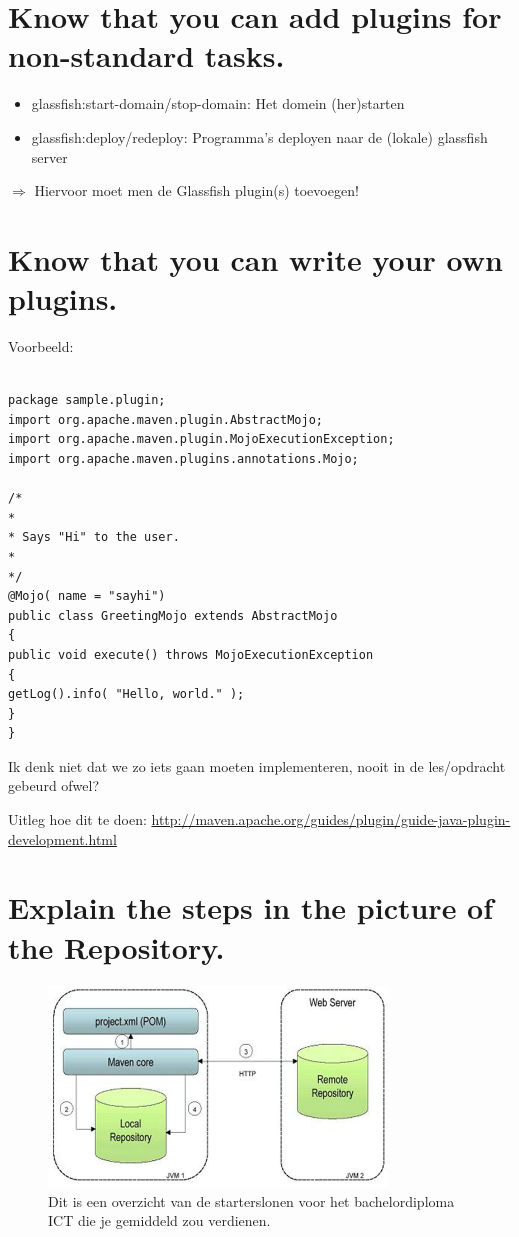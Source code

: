 \section{Know that you can add plugins for non-standard tasks.}

\begin{itemize}
	\item glassfish:start-domain/stop-domain: Het domein (her)starten
	\item glassfish:deploy/redeploy: Programma’s deployen naar de (lokale) glassfish server
\end{itemize}

$\Rightarrow$ Hiervoor moet men de Glassfish plugin(s) toevoegen!

\section{Know that you can write your own plugins.}


Voorbeeld:

\begin{verbatim}

package sample.plugin;
import org.apache.maven.plugin.AbstractMojo;
import org.apache.maven.plugin.MojoExecutionException;
import org.apache.maven.plugins.annotations.Mojo;

/*
*
* Says "Hi" to the user.
*
*/
@Mojo( name = "sayhi")
public class GreetingMojo extends AbstractMojo
{
public void execute() throws MojoExecutionException
{
getLog().info( "Hello, world." );
}
}
\end{verbatim}

Ik denk niet dat we zo iets gaan moeten implementeren, nooit in de les/opdracht gebeurd ofwel?

Uitleg hoe dit te doen: 
\url{http://maven.apache.org/guides/plugin/guide-java-plugin-development.html}

\section{Explain the steps in the picture of the Repository.}


\begin{figure}[tbph!]
	\centering
	\includegraphics[width=9cm]{images/mavenoverzicht}
	\caption[Startersloon overzicht voor bachelor diploma ICT]{Dit is een overzicht van de starterslonen voor het bachelordiploma ICT die je gemiddeld zou verdienen.}
	\label{fig:startersloonictbachelor}
\end{figure}


